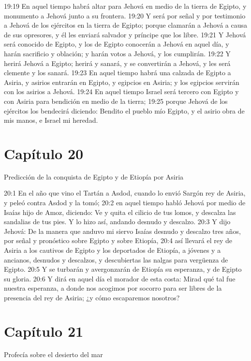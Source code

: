 19:19 En aquel tiempo habrá altar para Jehová en medio de la tierra de Egipto, y monumento a Jehová junto a su frontera. 
19:20 Y será por señal y por testimonio a Jehová de los ejércitos en la tierra de Egipto; porque clamarán a Jehová a causa de sus opresores, y él les enviará salvador y príncipe que los libre. 
19:21 Y Jehová será conocido de Egipto, y los de Egipto conocerán a Jehová en aquel día, y harán sacrificio y oblación; y harán votos a Jehová, y los cumplirán. 
19:22 Y herirá Jehová a Egipto; herirá y sanará, y se convertirán a Jehová, y les será clemente y los sanará. 
19:23 En aquel tiempo habrá una calzada de Egipto a Asiria, y asirios entrarán en Egipto, y egipcios en Asiria; y los egipcios servirán con los asirios a Jehová. 
19:24 En aquel tiempo Israel será tercero con Egipto y con Asiria para bendición en medio de la tierra; 
19:25 porque Jehová de los ejércitos los bendecirá diciendo: Bendito el pueblo mío Egipto, y el asirio obra de mis manos, e Israel mi heredad. 

\section*{Capítulo 20 }
Predicción de la conquista de Egipto y de Etiopía por Asiria 
 
20:1 En el año que vino el Tartán a Asdod, cuando lo envió Sargón rey de Asiria, y peleó contra Asdod y la tomó; 
20:2 en aquel tiempo habló Jehová por medio de Isaías hijo de Amoz, diciendo: Ve y quita el cilicio de tus lomos, y descalza las sandalias de tus pies. Y lo hizo así, andando desnudo y descalzo. 
20:3 Y dijo Jehová: De la manera que anduvo mi siervo Isaías desnudo y descalzo tres años, por señal y pronóstico sobre Egipto y sobre Etiopía, 
20:4 así llevará el rey de Asiria a los cautivos de Egipto y los deportados de Etiopía, a jóvenes y a ancianos, desnudos y descalzos, y descubiertas las nalgas para vergüenza de Egipto. 
20:5 Y se turbarán y avergonzarán de Etiopía su esperanza, y de Egipto su gloria. 
20:6 Y dirá en aquel día el morador de esta costa: Mirad qué tal fue nuestra esperanza, a donde nos acogimos por socorro para ser libres de la presencia del rey de Asiria; ¿y cómo escaparemos nosotros? 
\section*{Capítulo 21 }
Profecía sobre el desierto del mar 
 
